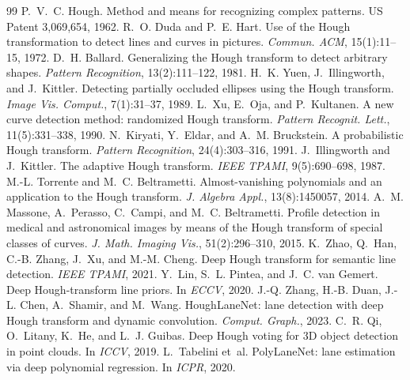 \documentclass[11pt]{article}
\begin{document}

\begin{thebibliography}{99}
 P.~V.~C. Hough. Method and means for recognizing complex patterns. US Patent 3,069,654, 1962.
 R.~O. Duda and P.~E. Hart. Use of the Hough transformation to detect lines and curves in pictures. \emph{Commun. ACM}, 15(1):11--15, 1972.
 D.~H. Ballard. Generalizing the Hough transform to detect arbitrary shapes. \emph{Pattern Recognition}, 13(2):111--122, 1981.
 H.~K. Yuen, J.~Illingworth, and J.~Kittler. Detecting partially occluded ellipses using the Hough transform. \emph{Image Vis. Comput.}, 7(1):31--37, 1989.
 L.~Xu, E.~Oja, and P.~Kultanen. A new curve detection method: randomized Hough transform. \emph{Pattern Recognit. Lett.}, 11(5):331--338, 1990.
 N.~Kiryati, Y.~Eldar, and A.~M. Bruckstein. A probabilistic Hough transform. \emph{Pattern Recognition}, 24(4):303--316, 1991.
 J.~Illingworth and J.~Kittler. The adaptive Hough transform. \emph{IEEE TPAMI}, 9(5):690--698, 1987.
 M.-L. Torrente and M.~C. Beltrametti. Almost-vanishing polynomials and an application to the Hough transform. \emph{J. Algebra Appl.}, 13(8):1450057, 2014.
 A.~M. Massone, A.~Perasso, C.~Campi, and M.~C. Beltrametti. Profile detection in medical and astronomical images by means of the Hough transform of special classes of curves. \emph{J. Math. Imaging Vis.}, 51(2):296--310, 2015.
 K.~Zhao, Q.~Han, C.-B. Zhang, J.~Xu, and M.-M. Cheng. Deep Hough transform for semantic line detection. \emph{IEEE TPAMI}, 2021.
 Y.~Lin, S.~L. Pintea, and J.~C. van Gemert. Deep Hough-transform line priors. In \emph{ECCV}, 2020.
 J.-Q. Zhang, H.-B. Duan, J.-L. Chen, A.~Shamir, and M.~Wang. HoughLaneNet: lane detection with deep Hough transform and dynamic convolution. \emph{Comput. Graph.}, 2023.
 C.~R. Qi, O.~Litany, K.~He, and L.~J. Guibas. Deep Hough voting for 3D object detection in point clouds. In \emph{ICCV}, 2019.
 L.~Tabelini et~al. PolyLaneNet: lane estimation via deep polynomial regression. In \emph{ICPR}, 2020.

\end{thebibliography}
\end{document}
